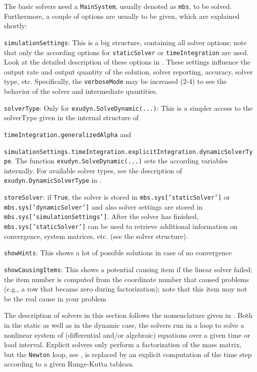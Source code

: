 The basic solvers need a \texttt{MainSystem}, usually denoted as \texttt{mbs}, to be solved. Furthermore, a couple of options are usually to be given, which are explained shortly:
\bi
  \item \texttt{simulationSettings}: This is a big structure, containing all solver options; note that only the according options for \texttt{staticSolver} or \texttt{timeIntegration} are used. Look at the detailed description of these options in . These settings influence the output rate and output quantity of the solution, solver reporting, accuracy, solver type, etc. Specifically, the \texttt{verboseMode} may be increased (2-4) to see the behavior of the solver and intermediate quantities.
  \item \texttt{solverType}: Only for \texttt{exudyn.SolveDynamic(...)}: This is a simpler access to the solverType given in the internal structure of 
  \bi
  \item[] \texttt{timeIntegration.generalizedAlpha} and 
  \item[] \texttt{simulationSettings.timeIntegration.explicitIntegration.dynamicSolverType}.
  \ei
  The function \texttt{exudyn.SolveDynamic(...)} sets the according variables internally. For available solver types, see the description of \texttt{exudyn.DynamicSolverType} in .
  \item \texttt{storeSolver}: if \texttt{True}, the solver is stored in \texttt{mbs.sys['staticSolver']} or \texttt{mbs.sys['dynamicSolver']} and also solver settings are stored in \texttt{mbs.sys['simulationSettings']}. After the solver has finished, \texttt{mbs.sys['staticSolver']} can be used to retrieve additional information on convergence, system matrices, etc. (see the solver structure).
  \item \texttt{showHints}: This shows a lot of possible solutions in case of no convergence
  \item \texttt{showCausingItems}: This shows a potential causing item if the linear solver failed; the item number is computed from the coordinate number that caused problems (e.g., a row that became zero during factorization); note that this item may not be the real cause in your problem
\ei

The description of solvers in this section follows the nomenclature given in .
Both in the static as well as in the dynamic case, the solvers run in a loop to solve a nonlinear system of (differential and/or algebraic) equations over a given time or load interval. Explicit solvers only perform a factorization of the mass matrix, but the \texttt{Newton} loop, see , is replaced by an explicit computation of the time step according to a given Runge-Kutta tableau.

